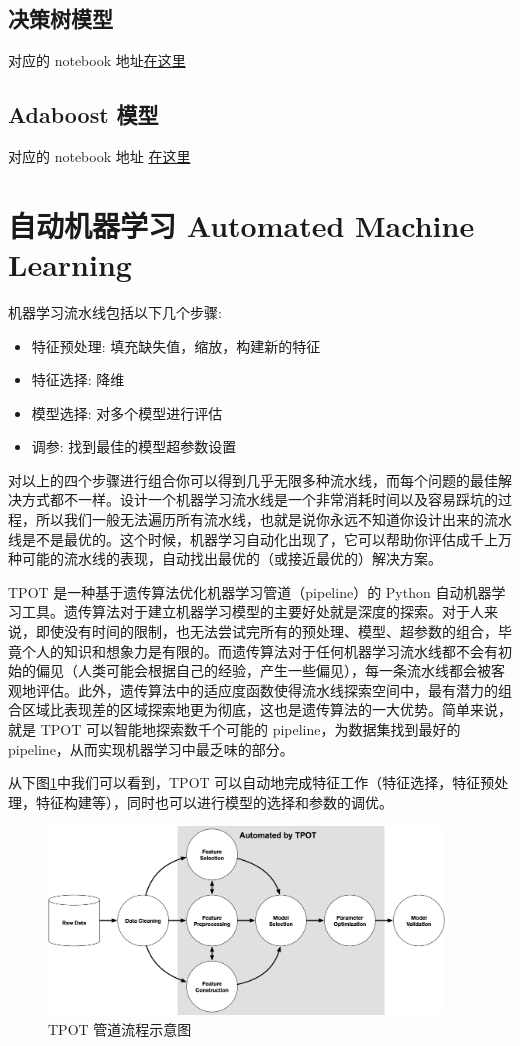 \documentclass[a4paper]{article}
\begin{document}
\subsection{决策树模型} \label{sub:dt}
对应的 notebook 地址\href{https://github.com/lidatou1991/udacity_final_rossmann/blob/master/DT-model.ipynb}{在这里}
\subsection{Adaboost 模型} \label{sub:adboost}
对应的 notebook 地址 \href{https://github.com/lidatou1991/udacity_final_rossmann/blob/master/Adaboost.ipynb}{在这里}
\section{自动机器学习 Automated Machine Learning}\label{tpot}
机器学习流水线包括以下几个步骤:
\begin{itemize}
    \item 特征预处理: 填充缺失值，缩放，构建新的特征
    \item 特征选择: 降维
    \item 模型选择: 对多个模型进行评估
    \item 调参: 找到最佳的模型超参数设置
\end{itemize}
对以上的四个步骤进行组合你可以得到几乎无限多种流水线，而每个问题的最佳解决方式都不一样。设计一个机器学习流水线是一个非常消耗时间以及容易踩坑的过程，所以我们一般无法遍历所有流水线，也就是说你永远不知道你设计出来的流水线是不是最优的。这个时候，机器学习自动化出现了，它可以帮助你评估成千上万种可能的流水线的表现，自动找出最优的（或接近最优的）解决方案。

TPOT 是一种基于遗传算法优化机器学习管道（pipeline）的 Python 自动机器学习工具。遗传算法对于建立机器学习模型的主要好处就是深度的探索。对于人来说，即使没有时间的限制，也无法尝试完所有的预处理、模型、超参数的组合，毕竟个人的知识和想象力是有限的。而遗传算法对于任何机器学习流水线都不会有初始的偏见（人类可能会根据自己的经验，产生一些偏见），每一条流水线都会被客观地评估。此外，遗传算法中的适应度函数使得流水线探索空间中，最有潜力的组合区域比表现差的区域探索地更为彻底，这也是遗传算法的一大优势。简单来说，就是 TPOT 可以智能地探索数千个可能的 pipeline，为数据集找到最好的 pipeline，从而实现机器学习中最乏味的部分。

从下图\ref{tpot}中我们可以看到，TPOT 可以自动地完成特征工作（特征选择，特征预处理，特征构建等），同时也可以进行模型的选择和参数的调优。

\begin{figure}[ht]
 \centering
 \includegraphics[height=5cm]{images/tpot-ml-pipeline}
 \caption{TPOT 管道流程示意图}
 \label{fig:tpot}
\end{figure}
\end{document}
